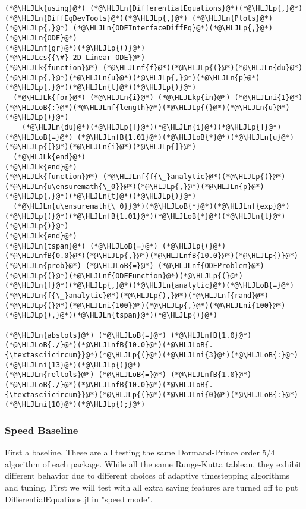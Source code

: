 \documentclass[12pt,a4paper]{article}
\newcommand{\HLJLk}[1]{\textcolor[RGB]{148,91,176}{\textbf{#1}}}
\newcommand{\HLJLkp}[1]{\textcolor[RGB]{148,91,176}{\textbf{#1}}}
\newcommand{\HLJLn}[1]{#1}
\newcommand{\HLJLnf}[1]{\textcolor[RGB]{66,102,213}{#1}}
\newcommand{\HLJLnfB}[1]{\textcolor[RGB]{59,151,46}{#1}}
\newcommand{\HLJLni}[1]{\textcolor[RGB]{59,151,46}{#1}}
\newcommand{\HLJLoB}[1]{\textcolor[RGB]{102,102,102}{\textbf{#1}}}
\newcommand{\HLJLp}[1]{#1}
\newcommand{\HLJLcs}[1]{\textcolor[RGB]{153,153,119}{\textit{#1}}}
\begin{document}
\begin{lstlisting}
(*@\HLJLk{using}@*) (*@\HLJLn{DifferentialEquations}@*)(*@\HLJLp{,}@*) (*@\HLJLn{DiffEqDevTools}@*)(*@\HLJLp{,}@*) (*@\HLJLn{Plots}@*)(*@\HLJLp{,}@*) (*@\HLJLn{ODEInterfaceDiffEq}@*)(*@\HLJLp{,}@*) (*@\HLJLn{ODE}@*)
(*@\HLJLnf{gr}@*)(*@\HLJLp{()}@*)
(*@\HLJLcs{{\#} 2D Linear ODE}@*)
(*@\HLJLk{function}@*) (*@\HLJLnf{f}@*)(*@\HLJLp{(}@*)(*@\HLJLn{du}@*)(*@\HLJLp{,}@*)(*@\HLJLn{u}@*)(*@\HLJLp{,}@*)(*@\HLJLn{p}@*)(*@\HLJLp{,}@*)(*@\HLJLn{t}@*)(*@\HLJLp{)}@*)
  (*@\HLJLk{for}@*) (*@\HLJLn{i}@*) (*@\HLJLkp{in}@*) (*@\HLJLni{1}@*)(*@\HLJLoB{:}@*)(*@\HLJLnf{length}@*)(*@\HLJLp{(}@*)(*@\HLJLn{u}@*)(*@\HLJLp{)}@*)
    (*@\HLJLn{du}@*)(*@\HLJLp{[}@*)(*@\HLJLn{i}@*)(*@\HLJLp{]}@*) (*@\HLJLoB{=}@*) (*@\HLJLnfB{1.01}@*)(*@\HLJLoB{*}@*)(*@\HLJLn{u}@*)(*@\HLJLp{[}@*)(*@\HLJLn{i}@*)(*@\HLJLp{]}@*)
  (*@\HLJLk{end}@*)
(*@\HLJLk{end}@*)
(*@\HLJLk{function}@*) (*@\HLJLnf{f{\_}analytic}@*)(*@\HLJLp{(}@*)(*@\HLJLn{u\ensuremath{\_0}}@*)(*@\HLJLp{,}@*)(*@\HLJLn{p}@*)(*@\HLJLp{,}@*)(*@\HLJLn{t}@*)(*@\HLJLp{)}@*)
  (*@\HLJLn{u\ensuremath{\_0}}@*)(*@\HLJLoB{*}@*)(*@\HLJLnf{exp}@*)(*@\HLJLp{(}@*)(*@\HLJLnfB{1.01}@*)(*@\HLJLoB{*}@*)(*@\HLJLn{t}@*)(*@\HLJLp{)}@*)
(*@\HLJLk{end}@*)
(*@\HLJLn{tspan}@*) (*@\HLJLoB{=}@*) (*@\HLJLp{(}@*)(*@\HLJLnfB{0.0}@*)(*@\HLJLp{,}@*)(*@\HLJLnfB{10.0}@*)(*@\HLJLp{)}@*)
(*@\HLJLn{prob}@*) (*@\HLJLoB{=}@*) (*@\HLJLnf{ODEProblem}@*)(*@\HLJLp{(}@*)(*@\HLJLnf{ODEFunction}@*)(*@\HLJLp{(}@*)(*@\HLJLn{f}@*)(*@\HLJLp{,}@*)(*@\HLJLn{analytic}@*)(*@\HLJLoB{=}@*)(*@\HLJLn{f{\_}analytic}@*)(*@\HLJLp{),}@*)(*@\HLJLnf{rand}@*)(*@\HLJLp{(}@*)(*@\HLJLni{100}@*)(*@\HLJLp{,}@*)(*@\HLJLni{100}@*)(*@\HLJLp{),}@*)(*@\HLJLn{tspan}@*)(*@\HLJLp{)}@*)

(*@\HLJLn{abstols}@*) (*@\HLJLoB{=}@*) (*@\HLJLnfB{1.0}@*)(*@\HLJLoB{./}@*)(*@\HLJLnfB{10.0}@*)(*@\HLJLoB{.{\textasciicircum}}@*)(*@\HLJLp{(}@*)(*@\HLJLni{3}@*)(*@\HLJLoB{:}@*)(*@\HLJLni{13}@*)(*@\HLJLp{)}@*)
(*@\HLJLn{reltols}@*) (*@\HLJLoB{=}@*) (*@\HLJLnfB{1.0}@*)(*@\HLJLoB{./}@*)(*@\HLJLnfB{10.0}@*)(*@\HLJLoB{.{\textasciicircum}}@*)(*@\HLJLp{(}@*)(*@\HLJLni{0}@*)(*@\HLJLoB{:}@*)(*@\HLJLni{10}@*)(*@\HLJLp{);}@*)
\end{lstlisting}


\subsubsection{Speed Baseline}
First a baseline. These are all testing the same Dormand-Prince order 5/4 algorithm of each package. While all the same Runge-Kutta tableau, they exhibit different behavior due to different choices of adaptive timestepping algorithms and tuning. First we will test with all extra saving features are turned off to put DifferentialEquations.jl in "speed mode".
\end{document}
